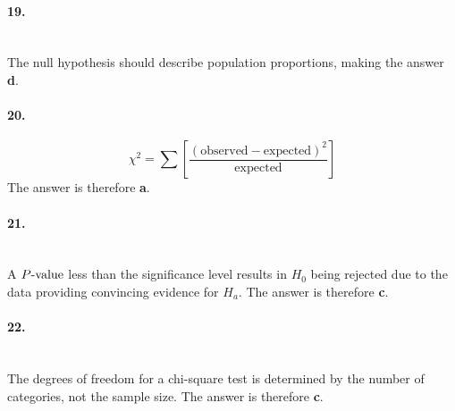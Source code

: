 \documentclass[../Homework]{subfiles}
\begin{document}
		\paragraph{19.}\ \\
			The null hypothesis should describe population proportions, making the answer \textbf{d}.
		\paragraph{20.}
			\[\chi^2 = \sum\left[\mathrm{\frac{(observed - expected)^2}{expected}}\right]\]
			The answer is therefore \textbf{a}.
		\paragraph{21.}\ \\
			A $P\text{-value}$ less than the significance level results in $H_0$ being rejected due to the data providing convincing evidence for $H_a$. The answer is therefore \textbf{c}.
		\paragraph{22.}\ \\
			The degrees of freedom for a chi-square test is determined by the number of categories, not the sample size. The answer is therefore \textbf{c}.
\end{document}

